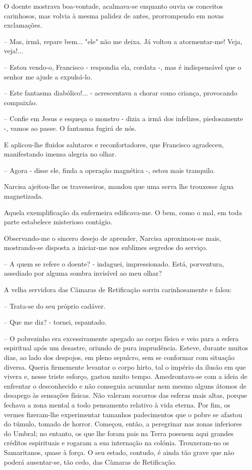 \documentclass[portuguese,12pt,a4paper]{scrbook}
\begin{document}
	O doente mostrava boa-vontade, acalmava-se enquanto ouvia os conceitos carinhosos, mas volvia à mesma palidez de antes, prorrompendo em novas exclamações.
	
	– Mas, irmã, repare bem... "ele" não me deixa. Já voltou a atormentar-me! Veja, veja!...
	
	– Estou vendo-o, Francisco - respondia ela, cordata -, mas é indispensável que o senhor me ajude a expulsá-lo.
	
	– Este fantasma diabólico!... - acrescentava a chorar como criança, provocando compaixão.
	
	– Confie em Jesus e esqueça o monstro - dizia a irmã dos infelizes, piedosamente -, vamos ao passe. O fantasma fugirá de nós.
	
	E aplicou-lhe fluidos salutares e reconfortadores, que Francisco agradeceu, manifestando imensa alegria no olhar.
	
	– Agora - disse ele, finda a operação magnética -, estou mais tranquilo.
	
	Narcisa ajeitou-lhe os travesseiros, mandou que uma serva lhe trouxesse água magnetizada.
	
	Aquela exemplificação da enfermeira edificava-me. O bem, como o mal, em toda parte estabelece misterioso contágio.
	
	Observando-me o sincero desejo de aprender, Narcisa aproximou-se mais, mostrando-se disposta a iniciar-me nos sublimes segredos do serviço.
	
	
	– A quem se refere o doente? - indaguei, impressionado. Está, porventura, assediado por alguma sombra invisível ao meu olhar?
	
	A velha servidora das Câmaras de Retificação sorriu carinhosamente e falou:
	
	– Trata-se do seu próprio cadáver.
	
	– Que me diz? - tornei, espantado.
	
	– O pobrezinho era excessivamente apegado ao corpo físico e veio para a esfera espiritual após um desastre, oriundo de pura imprudência. Esteve, durante muitos dias, ao lado dos despojos, em pleno sepulcro, sem se conformar com situação diversa. Queria firmemente levantar o corpo hirto, tal o império da ilusão em que vivera e, nesse triste esforço, gastou muito tempo. Amedrontava-se com a ideia de enfrentar o desconhecido e não conseguia acumular nem mesmo alguns átomos de desapego às sensações físicas. Não valeram socorros das esferas mais altas, porque fechava a zona mental a todo pensamento relativo à vida eterna. Por fim, os vermes fizeram-lhe experimentar tamanhos padecimentos que o pobre se afastou do túmulo, tomado de horror. Começou, então, a peregrinar nas zonas inferiores do Umbral; no entanto, os que lhe foram pais na Terra possuem aqui grandes créditos espirituais e rogaram a sua internação na colónia. Trouxeram-no os Samaritanos, quase à força. O seu estado, contudo, é ainda tão grave que não poderá ausentar-se, tão cedo, das Câmaras de Retificação.
	
\end{document}
